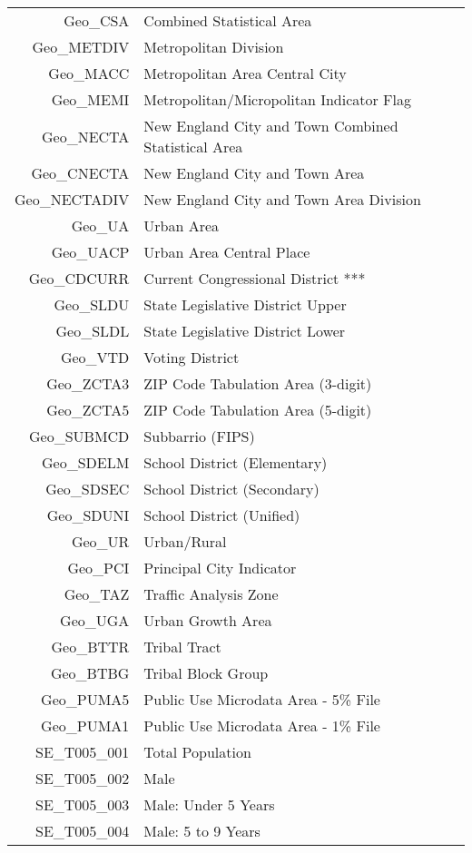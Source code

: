 \begin{longtable}{rp{5in}}
  Geo\_CSA & Combined Statistical Area \\ 
  Geo\_METDIV & Metropolitan Division \\ 
  Geo\_MACC & Metropolitan Area Central City \\ 
  Geo\_MEMI & Metropolitan/Micropolitan Indicator Flag \\ 
  Geo\_NECTA & New England City and Town Combined Statistical Area \\ 
  Geo\_CNECTA & New England City and Town Area \\ 
  Geo\_NECTADIV & New England City and Town Area Division \\ 
  Geo\_UA & Urban Area \\ 
  Geo\_UACP & Urban Area Central Place \\ 
  Geo\_CDCURR & Current Congressional District *** \\ 
  Geo\_SLDU & State Legislative District Upper \\ 
  Geo\_SLDL & State Legislative District Lower \\ 
  Geo\_VTD & Voting District \\ 
  Geo\_ZCTA3 & ZIP Code Tabulation Area (3-digit) \\ 
  Geo\_ZCTA5 & ZIP Code Tabulation Area (5-digit) \\ 
  Geo\_SUBMCD & Subbarrio (FIPS) \\ 
  Geo\_SDELM & School District (Elementary) \\ 
  Geo\_SDSEC & School District (Secondary) \\ 
  Geo\_SDUNI & School District (Unified) \\ 
  Geo\_UR & Urban/Rural \\ 
  Geo\_PCI & Principal City Indicator \\ 
  Geo\_TAZ & Traffic Analysis Zone \\ 
  Geo\_UGA & Urban Growth Area \\ 
  Geo\_BTTR & Tribal Tract \\ 
  Geo\_BTBG & Tribal Block Group \\ 
  Geo\_PUMA5 & Public Use Microdata Area - 5\% File \\ 
  Geo\_PUMA1 & Public Use Microdata Area - 1\% File \\ 
  SE\_T005\_001 & Total Population \\ 
  SE\_T005\_002 & Male \\ 
  SE\_T005\_003 & Male: Under 5 Years \\ 
  SE\_T005\_004 & Male: 5 to 9 Years \\ 

\end{longtable}
